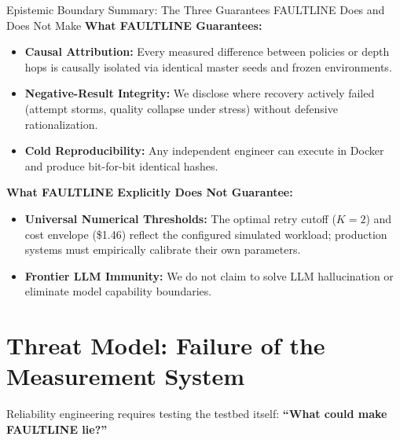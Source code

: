 \vspace{10pt}
\begin{callout}[secondary]{Epistemic Boundary Summary: The Three Guarantees FAULTLINE Does and Does Not Make}
\textbf{What FAULTLINE Guarantees:}
\begin{itemize}
\setlength{\itemsep}{1pt}\setlength{\parskip}{0pt}
    \item \textbf{Causal Attribution:} Every measured difference between policies or depth hops is causally isolated via identical master seeds and frozen environments.
    \item \textbf{Negative-Result Integrity:} We disclose where recovery actively failed (attempt storms, quality collapse under stress) without defensive rationalization.
    \item \textbf{Cold Reproducibility:} Any independent engineer can execute  in Docker and produce bit-for-bit identical hashes.
\end{itemize}
\vspace{4pt}
\textbf{What FAULTLINE Explicitly Does Not Guarantee:}
\begin{itemize}
\setlength{\itemsep}{1pt}\setlength{\parskip}{0pt}
    \item \textbf{Universal Numerical Thresholds:} The optimal retry cutoff ($K=2$) and cost envelope (\$1.46) reflect the configured simulated workload; production systems must empirically calibrate their own parameters.
    \item \textbf{Frontier LLM Immunity:} We do not claim to solve LLM hallucination or eliminate model capability boundaries.
\end{itemize}
\end{callout}

\section{Threat Model: Failure of the Measurement System}

Reliability engineering requires testing the testbed itself: \textbf{``What could make FAULTLINE lie?''}

